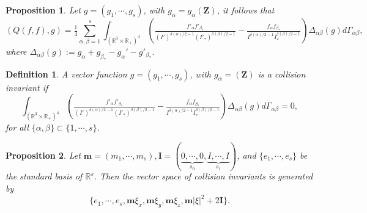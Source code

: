 \documentclass[reqno,11pt]{amsart}
\newtheorem{proposition}{Proposition}[section]
\newtheorem{definition}{Definition}[section]
\numberwithin{equation}{section}
\def\R{\mathbb{R}}
\begin{document}
\begin{proposition}\label{prop 2.2}
	Let $g= (g_1,\cdots , g_s)$, with $g_\alpha =g_\alpha (\mathbf{Z} )$, it follows that 
	\begin{equation*}
		(Q(f,f),g) 
		= \tfrac{1}{4}\sum \limits_{\alpha , \beta =1}^s \int_{(\R^3\times \R_+)^4} (\tfrac{f'_\alpha f'_{\beta_*}}{(I')^{\delta(\alpha)/2-1} (I'_* )^{\delta(\beta)/2-1}} - \tfrac{f_\alpha f_{\beta_*}}{I^{\delta(\alpha)/2-1} I_* ^{\delta(\beta)/2-1}}) \Delta_{\alpha \beta } (g) d \Gamma_{\alpha \beta },
	\end{equation*}
	where $\Delta_{\alpha \beta } (g) := g_\alpha +g_{\beta_*}-g_\alpha ' - g'_{\beta _*} $.
\end{proposition}

\begin{definition}
	A vector function $g= (g_1,\cdots , g_s)$, with $g_\alpha = (\mathbf{Z} )$ is a collision invariant if 
	\begin{equation*}
		\int_{(\R^3 \times \R_+)^4} (\tfrac{f'_\alpha f'_{\beta_*}}{(I')^{\delta(\alpha)/2-1} (I'_* )^{\delta(\beta)/2-1}} - \tfrac{f_\alpha f_{\beta_*}}{I^{\delta(\alpha)/2-1} I_* ^{\delta(\beta)/2-1}}) \Delta_{\alpha \beta } (g) d\Gamma_{\alpha \beta } =0,
	\end{equation*}
	for all $\{ \alpha, \beta \} \subset \{1, \cdots , s\}$.
\end{definition}

\begin{proposition}\label{prop2.3}
	Let $\mathbf{m}=(m_1,\cdots, m_s), \mathbf{I} = (\underbrace{0,\cdots ,0}_{s_0} ,\underbrace{I,\cdots , I}_{s_1} )$, and $\{e_1,\cdots , e_s\}$ be the standard basis of $\R^s$. Then the vector space of collision invariants is generated by 
	\begin{equation*}
		\{e_1, \cdots ,e_s, \mathbf{m} \xi_x, \mathbf{m} \xi_y, \mathbf{m} \xi_z ,\mathbf{m} |\xi|^2+2\mathbf{I}\}.
	\end{equation*}
\end{proposition}
\end{document}
